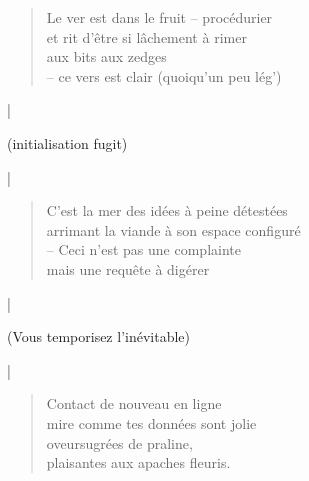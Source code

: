   \begin{verse}
    Le ver est dans le fruit -- procédurier\\
    et rit d’être si lâchement à rimer\\
    aux bits aux zedges\\
    -- ce vers est clair (quoiqu’un peu lég’)
  \end{verse}
  \begin{center}
    |
  \end{center}
  \begin{center}
    (initialisation fugit)
  \end{center}
  \begin{center}
    |
  \end{center}
  \begin{verse}
    C’est la mer des idées à peine détestées\\
    arrimant la viande à son espace configuré\\
    -- Ceci n’est pas une complainte\\
    mais une requête à digérer
  \end{verse}
  \begin{center}
    |
  \end{center}
  \begin{center}
    (Vous temporisez l’inévitable)
  \end{center}
  \begin{center}
    |
  \end{center}
  \begin{verse}
    Contact de nouveau en ligne\\
    mire comme tes données sont jolie\\
    oveursugrées de praline,\\
    plaisantes aux apaches fleuris.
  \end{verse}

